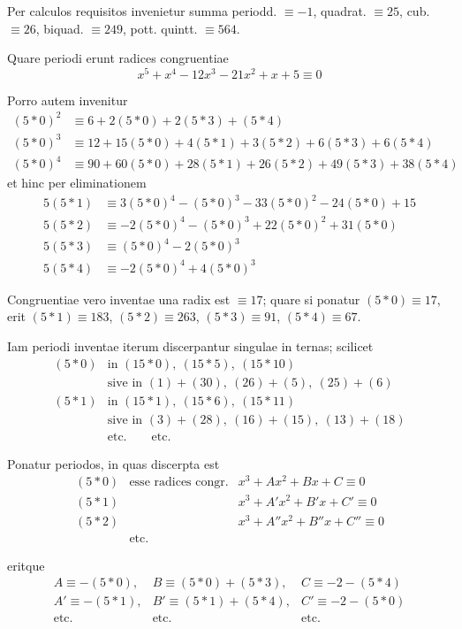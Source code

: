 Per calculos requisitos invenietur summa periodd. $\equiv-1$, quadrat. $\equiv25$, cub. $\equiv26$, biquad. $\equiv249$, pott. quintt. $\equiv564$.

Quare periodi erunt radices congruentiae
\[
x^5+x^4-12x^3-21x^2+x+5\equiv0
\]

Porro autem invenitur
\[
\begin{aligned}
(5\ast0)^2&\equiv6+2(5\ast0)+2(5\ast3)+(5\ast4)\\
(5\ast0)^3&\equiv12+15(5\ast0)+4(5\ast1)+3(5\ast2)+6(5\ast3)+6(5\ast4)\\
(5\ast0)^4&\equiv90+60(5\ast0)+28(5\ast1)+26(5\ast2)+49(5\ast3)+38(5\ast4)
\end{aligned}
\]
et hinc per eliminationem
\[
\begin{aligned}
5(5\ast1)&\equiv3(5\ast0)^4-(5\ast0)^3-33(5\ast0)^2-24(5\ast0)+15\\
5(5\ast2)&\equiv-2(5\ast0)^4-(5\ast0)^3+22(5\ast0)^2+31(5\ast0)\\
5(5\ast3)&\equiv(5\ast0)^4-2(5\ast0)^3\\
5(5\ast4)&\equiv-2(5\ast0)^4+4(5\ast0)^3
\end{aligned}
\]

Congruentiae vero inventae una radix est $\equiv17$; quare si ponatur $(5\ast0)\equiv17$, erit $(5\ast1)\equiv183$, $(5\ast2)\equiv263$, $(5\ast3)\equiv91$, $(5\ast4)\equiv67$.

Iam periodi inventae iterum discerpantur singulae in ternas; scilicet
\[
\begin{array}{rl}
(5\ast0)&\text{in }(15\ast0),\ (15\ast5),\ (15\ast10)\\
&\text{sive in }(1)+(30),\ (26)+(5),\ (25)+(6)\\
(5\ast1)&\text{in }(15\ast1),\ (15\ast6),\ (15\ast11)\\
&\text{sive in }(3)+(28),\ (16)+(15),\ (13)+(18)\\
&\text{etc.}\qquad\text{etc.}
\end{array}
\]

Ponatur periodos, in quas discerpta est
\[
\begin{array}{rll}
(5\ast0)&\text{esse radices congr.}&x^3+Ax^2+Bx+C\equiv0\\
(5\ast1)&&x^3+A'x^2+B'x+C'\equiv0\\
(5\ast2)&&x^3+A''x^2+B''x+C''\equiv0\\
&\text{etc.}
\end{array}
\]

eritque
\[
\begin{array}{lll}
A\equiv-(5\ast0),&B\equiv(5\ast0)+(5\ast3),&C\equiv-2-(5\ast4)\\
A'\equiv-(5\ast1),&B'\equiv(5\ast1)+(5\ast4),&C'\equiv-2-(5\ast0)\\
\text{etc.}&\text{etc.}&\text{etc.}
\end{array}
\]

